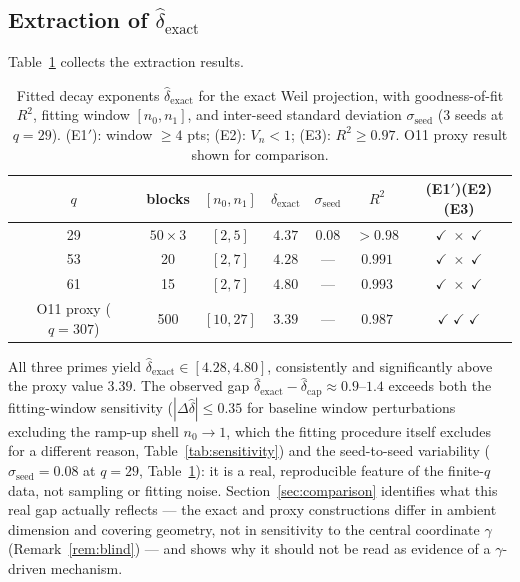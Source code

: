   \subsection{Extraction of $\hat{\delta}_{\mathrm{exact}}$}
    \label{sec:extraction}

    Table~\ref{tab:delta} collects the extraction results.

    \begin{table}[ht]
      \centering
      \caption{Fitted decay exponents $\hat{\delta}_{\mathrm{exact}}$ for the exact Weil
      projection, with goodness-of-fit $R^2$, fitting window $[n_0,n_1]$, and
      inter-seed standard deviation $\sigma_{\mathrm{seed}}$ (3 seeds at $q=29$).
        (E1$'$): window $\geq 4$ pts; (E2): $V_n<1$; (E3): $R^2\geq 0.97$.
        O11 proxy result shown for comparison.}
      \label{tab:delta}
      \begin{tabular}{ccccccc}
        \hline
        $q$ & blocks & $[n_0,n_1]$ & $\hat{\delta}_{\mathrm{exact}}$ &
        $\sigma_{\mathrm{seed}}$ & $R^2$ & (E1$'$)(E2)(E3) \\
        \hline
        29 & $50\times 3$ & $[2,5]$ & $4.37$ & $0.08$ & $>0.98$
        & $\checkmark\;\times\;\checkmark$ \\
        53 & 20 & $[2,7]$ & $4.28$ & --- & $0.991$
        & $\checkmark\;\times\;\checkmark$ \\
        61 & 15 & $[2,7]$ & $4.80$ & --- & $0.993$
        & $\checkmark\;\times\;\checkmark$ \\
        \hline
        O11 proxy ($q{=}307$) & 500 & $[10,27]$ & $3.39$ & --- & $0.987$
        & $\checkmark\;\checkmark\;\checkmark$ \\
        \hline
      \end{tabular}
    \end{table}

    All three primes yield $\hat{\delta}_{\mathrm{exact}} \in [4.28, 4.80]$, consistently
    and significantly above the proxy value $3.39$.
    The observed gap $\hat{\delta}_{\mathrm{exact}} - \hat{\delta}_{\mathrm{cap}} \approx 0.9$--$1.4$
    exceeds both the fitting-window sensitivity ($|\Delta\hat\delta| \leq 0.35$
    for baseline window perturbations excluding the ramp-up shell $n_0\to1$, which the
    fitting procedure itself excludes for a different reason, Table~\ref{tab:sensitivity})
    and the seed-to-seed
    variability ($\sigma_{\mathrm{seed}} = 0.08$ at $q=29$, Table~\ref{tab:delta}): it is a
    real, reproducible feature of the finite-$q$ data, not sampling or fitting noise.
    Section~\ref{sec:comparison} identifies what this real gap actually reflects — the exact
    and proxy constructions differ in ambient dimension and covering geometry, not in
    sensitivity to the central coordinate $\gamma$ (Remark~\ref{rem:blind}) — and shows why
    it should not be read as evidence of a $\gamma$-driven mechanism.

